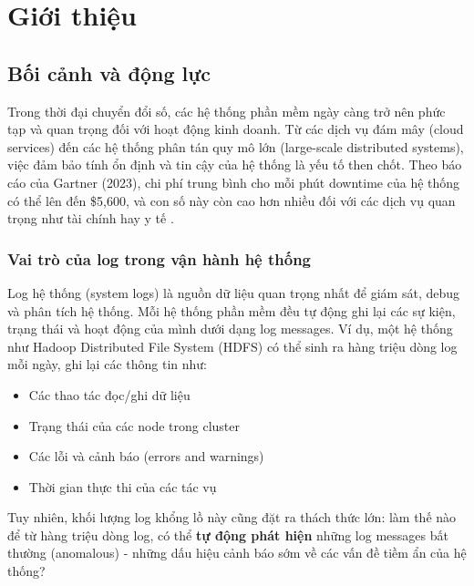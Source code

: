 
\chapter{Giới thiệu}
\label{chap:introduction}

\section{Bối cảnh và động lực}
\label{sec:motivation}

Trong thời đại chuyển đổi số, các hệ thống phần mềm ngày càng trở nên phức tạp và quan trọng đối với hoạt động kinh doanh. Từ các dịch vụ đám mây (cloud services) đến các hệ thống phân tán quy mô lớn (large-scale distributed systems), việc đảm bảo tính ổn định và tin cậy của hệ thống là yếu tố then chốt. Theo báo cáo của Gartner (2023), chi phí trung bình cho mỗi phút downtime của hệ thống có thể lên đến \$5,600, và con số này còn cao hơn nhiều đối với các dịch vụ quan trọng như tài chính hay y tế \cite{gartner2023}.

\subsection{Vai trò của log trong vận hành hệ thống}

Log hệ thống (system logs) là nguồn dữ liệu quan trọng nhất để giám sát, debug và phân tích hệ thống. Mỗi hệ thống phần mềm đều tự động ghi lại các sự kiện, trạng thái và hoạt động của mình dưới dạng log messages. Ví dụ, một hệ thống như Hadoop Distributed File System (HDFS) có thể sinh ra hàng triệu dòng log mỗi ngày, ghi lại các thông tin như:

\begin{itemize}
    \item Các thao tác đọc/ghi dữ liệu
    \item Trạng thái của các node trong cluster
    \item Các lỗi và cảnh báo (errors and warnings)
    \item Thời gian thực thi của các tác vụ
\end{itemize}

Tuy nhiên, khối lượng log khổng lồ này cũng đặt ra thách thức lớn: làm thế nào để từ hàng triệu dòng log, có thể \textbf{tự động phát hiện} những log messages bất thường (anomalous) - những dấu hiệu cảnh báo sớm về các vấn đề tiềm ẩn của hệ thống?

